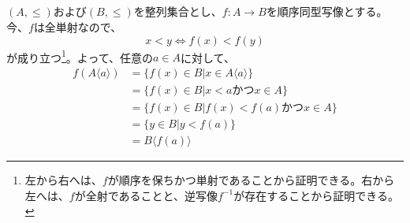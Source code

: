 \documentclass{jsarticle}
\begin{document}
\subsection{}
$(A,\leq)$および$(B,\leq)$を整列集合とし、$f:A\to B$を順序同型写像とする。今、$f$は全単射なので、
\[x<y\Longleftrightarrow f(x)<f(y)\]
が成り立つ\footnote{左から右へは、$f$が順序を保ちかつ単射であることから証明できる。右から左へは、$f$が全射であることと、逆写像$f^{-1}$が存在することから証明できる。}。よって、任意の$a\in A$に対して、
\begin{align*}
f(A\langle a\rangle)&=\{f(x)\in B| x\in A\langle a\rangle\}\\
&=\{f(x)\in B|x<a かつ x\in A\}\\
&=\{f(x)\in B|f(x)<f(a) かつ x\in A\}\\
&=\{y\in B|y<f(a)\}\\
&=B\langle f(a)\rangle
\end{align*}

\end{document}
